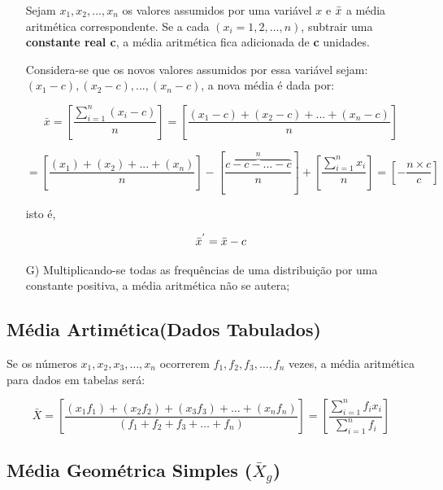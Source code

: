 \begin{enumerate}
Sejam $x_{1}, x_{2},...,x_{n}$ os valores assumidos por uma variável $x$ e $\Bar{x}$ a média aritmética correspondente. Se a cada $(x_{i}=1,2,...,n)$, subtrair uma \textbf{constante real c}, a média aritmética fica adicionada de \textbf{c} unidades.\vskip0.3cm


Considera-se que os novos valores assumidos por essa variável sejam: $(x_{1}-c),(x_{2}-c),...,(x_{n}-c)$, a nova média é dada por:


\begin{equation}\label{media3}
     \bar{x} = \left[ \frac{\sum_{i=1}^{n}(x_{i}-c)}{n} \right] = \left[ \frac{(x_{1}-c)+(x_{2}-c)+...+(x_{n}-c)}{n} \right] 
\end{equation}

\begin{equation*}\label{media4}
  = \left[ \frac{(x_{1})+(x_{2})+...+(x_{n})}{n} \right] - \left[ \overbrace{\frac{c-c-...-c}{n}}^{n} \right] + \left[ \frac{\sum_{i=1}^{n}x_{i}}{n} \right] = \left[ - \frac{n \times c}{c} \right]
\end{equation*}

isto é, 

$$\Bar{x}^{'}=\Bar{x}-c$$


\item [{G)}]Multiplicando-se todas as frequências de uma distribuição por uma constante positiva, a média aritmética não se autera; 
\end{enumerate}

\newpage
\subsection{Média Artimética(Dados Tabulados)}

Se os números $x_{1},x_{2},x_{3},\ldots, x_{n}$ ocorrerem $f_{1}, f_{2}, f_{3}, \ldots, f_{n}$ vezes, a média aritmética para dados em tabelas será:


\begin{equation}\label{media2}
     \bar{X}= \left[ \frac{(x_{1}f_{1}) + (x_{2}f_{2}) + (x_{3}f_{3})+
 \ldots + (x_{n}f_{n})}{(f_{1}+f_{2}+f_{3}+\ldots+f_{n})} \right ]=   \left[\frac{\sum_{i=1}^{n}f_{i}x_{i}}{\sum_{i=1}^{n}f_{i}} \right ]
\end{equation}


\subsection{Média Geométrica Simples ($\bar{X}_{g}$)}

